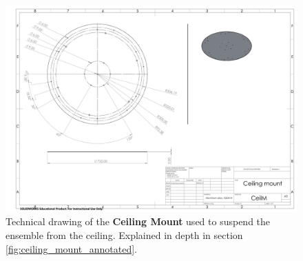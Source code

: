 \documentclass[12pt]{extarticle} %
\begin{document}
\begin{figure}
    \centering
    \includegraphics[width=1\textwidth ]{images/technical_drawings/Ceilling_mount_revised.png}
    \caption{Technical drawing of the \textbf{Ceiling Mount} used to suspend the ensemble from the ceiling. Explained in depth in section \ref{fig:ceiling_mount_annotated}.}
    \label{technical_drawing:ceiling_mount}
\end{figure}
\end{document}
